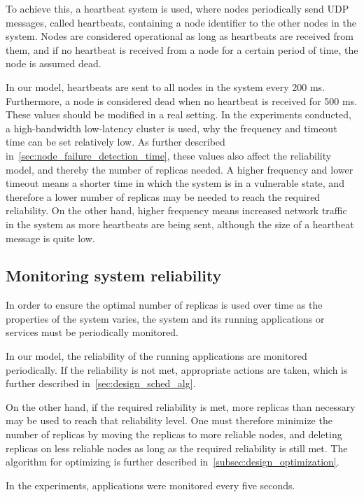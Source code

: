 \documentclass{cslthse-msc}
\begin{document}
To achieve this, a heartbeat system is used, where nodes periodically send UDP messages, called heartbeats, containing a node identifier to the other nodes in the system. Nodes are considered operational as long as heartbeats are received from them, and if no heartbeat is received from a node for a certain period of time, the node is assumed dead.

In our model, heartbeats are sent to all nodes in the system every 200 ms. Furthermore, a node is considered dead when no heartbeat is received for 500 ms. These values should be modified in a real setting. In the experiments conducted, a high-bandwidth low-latency cluster is used, why the frequency and timeout time can be set relatively low. As further described in~\cref{sec:node_failure_detection_time}, these values also affect the reliability model, and thereby the number of replicas needed. A higher frequency and lower timeout means a shorter time in which the system is in a vulnerable state, and therefore a lower number of replicas may be needed to reach the required reliability. On the other hand, higher frequency means increased network traffic in the system as more heartbeats are being sent, although the size of a heartbeat message is quite low. %

\subsection{Monitoring system reliability} \label{subsec:monitoring_system_rel}
In order to ensure the optimal number of replicas is used over time as the properties of the system varies, the system and its running applications or services must be periodically monitored. 

In our model, the reliability of the running applications are monitored periodically. If the reliability is not met, appropriate actions are taken, which is further described in~\cref{sec:design_sched_alg}.

On the other hand, if the required reliability is met, more replicas than necessary may be used to reach that reliability level. One must therefore minimize the number of replicas by moving the replicas to more reliable nodes, and deleting replicas on less reliable nodes as long as the required reliability is still met. The algorithm for optimizing is further described in~\cref{subsec:design_optimization}.

In the experiments, applications were monitored every five seconds.
\end{document}
